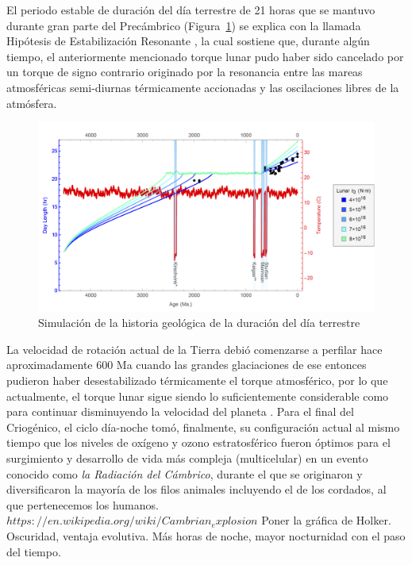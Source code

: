 El periodo estable de duración del día terrestre de 21 horas que se mantuvo durante gran parte del Precámbrico (Figura~\ref{duraciondia}) se explica con la llamada Hipótesis de Estabilización Resonante \citep{Zahnle&Walker1987}, la cual sostiene que, durante algún tiempo, el anteriormente mencionado torque lunar pudo haber sido cancelado por un torque de signo contrario originado por la resonancia entre las mareas atmosféricas semi-diurnas térmicamente accionadas y las oscilaciones libres de la atmósfera.\\

\begin{figure}
  \centering
    \includegraphics[width=1\textwidth]{duraciondeldiahistorico}
  \caption{Simulación de la historia geológica de la duración del día terrestre \citep{Stevenson&Bartlett2016}}
  \label{duraciondia}
\end{figure}

La velocidad de rotación actual de la Tierra debió comenzarse a perfilar hace aproximadamente 600 Ma cuando las grandes glaciaciones de ese entonces pudieron haber desestabilizado térmicamente el torque atmosférico, por lo que actualmente, el torque lunar sigue siendo lo suficientemente considerable como para continuar disminuyendo la velocidad del planeta \citep{Stevenson&Bartlett2016}. Para el final del Criogénico, el ciclo día-noche tomó, finalmente, su configuración actual al mismo tiempo que los niveles de oxígeno y ozono estratosférico fueron óptimos para el surgimiento y desarrollo de vida más compleja (multicelular) en un evento conocido como \textit{la Radiación del Cámbrico}, durante el que se originaron y diversificaron la mayoría de los filos animales incluyendo el de los cordados, al que pertenecemos los humanos.\\

$https://en.wikipedia.org/wiki/Cambrian_explosion$	
Poner la gráfica de Holker. Oscuridad, ventaja evolutiva. Más horas de noche, mayor nocturnidad con el paso del tiempo.\\

